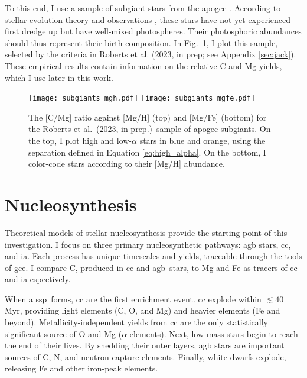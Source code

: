 \documentclass[12pt,oneside,letterpaper]{report}
\newcommand{\cc}{\gls{cc}}
\newcommand{\agb}{\gls{agb}}
\newcommand{\ia}{\gls{ia}}
\newcommand{\ssp}{\gls{ssp}}
\newcommand{\gce}{\gls{gce}}
\newcommand{\apogee}{\gls{apogee}}
\newcommand{\citetjack}{Roberts et al.~(2023, in prep.)}
\begin{document}
To this end, I use a sample of subgiant stars from the \apogee{} \citep{apogee17}. According to stellar evolution theory and observations \citep{gilroy89, korn+07, lind+08, souto+18, souto19}, these stars have not yet experienced first dredge up but have well-mixed photospheres. Their photosphoric abundances should thus represent their birth composition.  In Fig.~\ref{fig:subgiants}, I plot this sample, selected by the criteria in Roberts et al. (2023, in prep; see Appendix \ref{sec:jack}). These empirical results contain information on the relative C and Mg yields, which I use later in this work.

\begin{figure}[htp]
    \texttt{[image: subgiants\_mgh.pdf]}
    \texttt{[image: subgiants\_mgfe.pdf]}
    \caption[APOGEE Subgiants]{The [C/Mg] ratio against [Mg/H] (top) and [Mg/Fe] (bottom) for the \citetjack~sample of \apogee{} subgiants. On the top, I plot high and low-$\alpha$ stars in blue and orange, using the separation defined in Equation \ref{eq:high_alpha}. On the bottom, I color-code stars according to their [Mg/H] abundance.}
    \label{fig:subgiants}
\end{figure}








\chapter{Nucleosynthesis}

Theoretical models of stellar nucleosynthesis provide the starting point of this investigation. I focus on three primary nucleosynthetic pathways: \agb{} stars, \cc{}, and \ia. Each process has unique timescales and yields, traceable through the tools of \gce. I compare C, produced in \cc{} and \agb\ stars, to Mg and Fe as tracers of \cc{} and \ia{} espectively.

When a \ssp~forms, \cc{} are the first enrichment event. \cc{}  explode within $\lesssim 40$ Myr, providing light elements (C, O, and Mg) and heavier elements (Fe and beyond). Metallicity-independent yields from \cc{} are the only statistically significant source of O and Mg ($\alpha$ elements). Next, low-mass stars begin to reach the end of their lives. By shedding their outer layers, \agb{} stars are important sources of C, N, and neutron capture elements.  Finally, white dwarfs explode, releasing Fe and other iron-peak elements.
\end{document}
